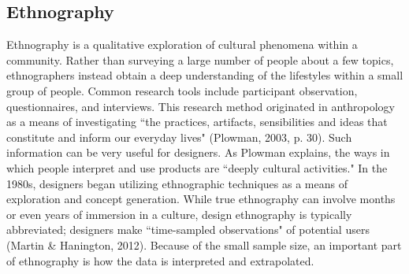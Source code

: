\subsection{Ethnography}
Ethnography is a qualitative exploration of cultural phenomena within a community. Rather than surveying a large number of people about a few topics, ethnographers instead obtain a deep understanding of the lifestyles within a small group of people. Common research tools include participant observation, questionnaires, and interviews. This research method originated in anthropology as a means of investigating ``the practices, artifacts, sensibilities and ideas that constitute and inform our everyday lives" (Plowman, 2003, p. 30). Such information can be very useful for designers. As Plowman explains, the ways in which people interpret and use products are ``deeply cultural activities." In the 1980s, designers began utilizing ethnographic techniques as a means of exploration and concept generation. While true ethnography can involve months or even years of immersion in a culture, design ethnography is typically abbreviated; designers make ``time-sampled observations" of potential users (Martin \& Hanington, 2012). Because of the small sample size, an important part of ethnography is how the data is interpreted and extrapolated.
